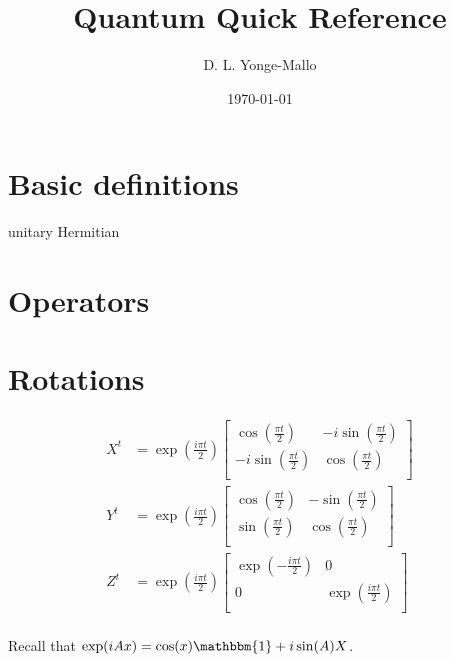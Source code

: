 \documentclass[a4paper,landscape,columns=3]{CheatSheet}
\title{Quantum Quick Reference}
\author{D. L. Yonge-Mallo}
\date{\today}
\begin{document}
\newcommand{\pithalf}{\ensuremath{\frac{\pi t}{2}}}
\newcommand{\ipithalf}{\ensuremath{\frac{i\pi t}{2}}}
\newcommand{\one}{\ensuremath{\mathbbm{1}}}

\maketitle


\section{Basic definitions}

unitary
Hermitian


\section{Operators}




\section{Rotations}


\begin{align*}
X^{t} &= \exp\left(\ipithalf\right)
\begin{bmatrix}
\cos\left(\pithalf\right) & -i\sin\left(\pithalf\right) \\
-i\sin\left(\pithalf\right) & \cos\left(\pithalf\right) \\
\end{bmatrix}\\
Y^{t} &= \exp\left(\ipithalf\right)
\begin{bmatrix}
\cos\left(\pithalf\right) & -\sin\left(\pithalf\right) \\
\sin\left(\pithalf\right) & \cos\left(\pithalf\right) \\
\end{bmatrix}\\
Z^{t} &= \exp\left(\ipithalf\right)
\begin{bmatrix}
\exp\left(-\ipithalf\right) & 0 \\
0 & \exp\left(\ipithalf\right) \\
\end{bmatrix}\\
\end{align*}

Recall that \(\exp(iAx) = \cos(x)\one + i\sin(A)X\).
\end{document}

